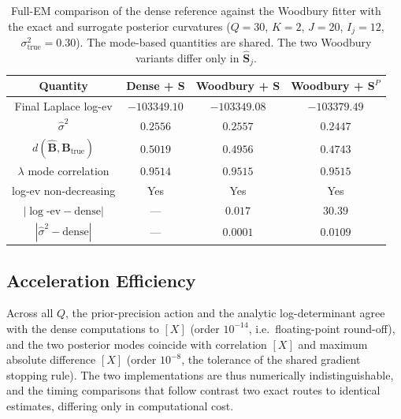 \begin{table}[H]
\centering
\caption{Full-EM comparison of the dense reference against the Woodbury fitter with the
exact and surrogate posterior curvatures ($Q=30$, $K=2$, $J=20$, $I_j=12$, $\sigma^2_{\text{true}}=0.30$).
The mode-based quantities are shared. The two Woodbury variants differ only in
$\hat{\mathbf{S}}_j$.}
\label{tab:Shat-compare}
\begin{tabular}{@{}cccc@{}}
\toprule
Quantity & Dense + $\mathbf S$ & Woodbury + $\mathbf S$ & Woodbury + $\mathbf S^{P}$ \\
\midrule
Final Laplace log-ev      & $-103349.10$ & $-103349.08$ & $-103379.49$ \\
$\hat{\sigma}^2$            & $0.2556$     & $0.2557$     & $0.2447$ \\
$d(\hat{\mathbf B},\mathbf B_{\text{true}})$ & $0.5019$ & $0.4956$ & $0.4743$ \\
$\lambda$ mode correlation      & $0.9514$     & $0.9515$     & $0.9515$ \\
log-ev non-decreasing     & Yes          & Yes          & Yes \\
\midrule
$|\log\text{-ev} - \text{dense}|$ & --- & $0.017$ & $30.39$ \\
$|\widehat\sigma^2 - \text{dense}|$ & --- & $0.0001$ & $0.0109$ \\
\bottomrule
\end{tabular}
\end{table}

\subsection*{Acceleration Efficiency}
\label{sec:acceleration-efficiency}

Across all $Q$, the prior-precision action and the analytic log-determinant agree with the
dense computations to $[X]$ (order $10^{-14}$, i.e.\ floating-point round-off), and the two
posterior modes coincide with correlation $[X]$ and maximum absolute difference $[X]$
(order $10^{-8}$, the tolerance of the shared gradient stopping rule). The two implementations
are thus numerically indistinguishable, and the timing comparisons that follow contrast two
exact routes to identical estimates, differing only in computational cost.

